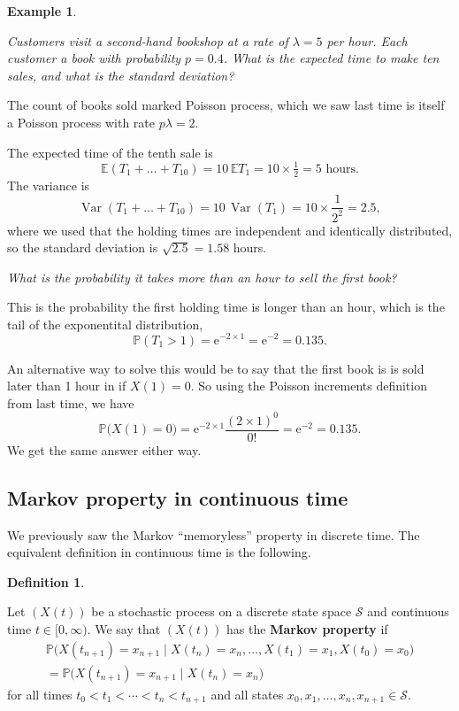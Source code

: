 \documentclass[
  a4paper,
]{article}
\theoremstyle{definition}
\newtheorem{definition}{Definition}[section]
\theoremstyle{definition}
\newtheorem{example}{Example}[section]
\theoremstyle{definition}
\theoremstyle{remark}
\begin{document}
\begin{example}
\protect\hypertarget{exm:bookshop}{}\label{exm:bookshop}

\emph{Customers visit a second-hand bookshop at a rate of \(\lambda = 5\) per hour. Each customer a book with probability \(p = 0.4\). What is the expected time to make ten sales, and what is the standard deviation?}

The count of books sold marked Poisson process, which we saw last time is itself a Poisson process with rate \(p\lambda = 2\).

The expected time of the tenth sale is
\[ \mathbb E(T_1 + \dots + T_{10}) = 10\,\mathbb ET_1 = 10 \times \tfrac{1}{2} = 5 \text{ hours} .\]
The variance is
\[ \operatorname{Var}(T_1 + \dots + T_{10}) = 10\,\operatorname{Var}(T_1) = 10 \times \frac{1}{2^2} = 2.5 , \]
where we used that the holding times are independent and identically distributed, so the standard deviation is \(\sqrt{2.5} = 1.58\) hours.

\emph{What is the probability it takes more than an hour to sell the first book?}

This is the probability the first holding time is longer than an hour, which is the tail of the exponentital distribution,
\[ \mathbb P(T_1 > 1) = \mathrm{e}^{-2\times 1} = \mathrm{e}^{-2} = 0.135. \]

An alternative way to solve this would be to say that the first book is is sold later than 1 hour in if \(X(1) = 0\). So using the Poisson increments definition from last time, we have
\[ \mathbb P\big(X(1) = 0\big) = \mathrm{e}^{-2\times 1} \frac{(2\times 1)^0}{0!}  = \mathrm{e}^{-2} = 0.135. \]
We get the same answer either way.

\end{example}

\hypertarget{cont-markov}{%
\subsection{Markov property in continuous time}\label{cont-markov}}

We previously saw the Markov ``memoryless'' property in discrete time. The equivalent definition in continuous time is the following.

\begin{definition}
\protect\hypertarget{def:pp}{}\label{def:pp}

Let \((X(t))\) be a stochastic process on a discrete state space \(\mathcal S\) and continuous time \(t \in [0,\infty)\). We say that \((X(t))\) has the \textbf{Markov property}
if
\begin{multline*}
\mathbb P\big( X(t_{n+1}) = x_{n+1} \mid X(t_n) = x_n, \dots, X(t_1) = x_1, X(t_0) = x_0 \big) \\
= \mathbb P\big( X(t_{n+1}) = x_{n+1} \mid X(t_n) = x_{n}\big)
\end{multline*}
for all times \(t_0 < t_1 < \cdots < t_n < t_{n+1}\) and all states \(x_0, x_1, \dots, x_n, x_{n+1} \in \mathcal S\).

\end{definition}
\end{document}
